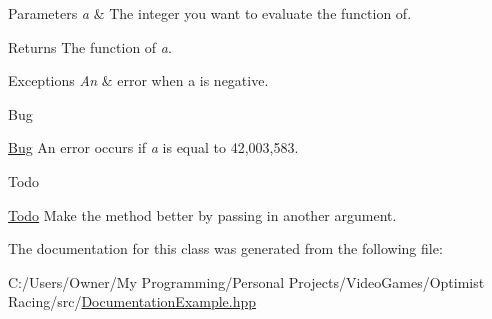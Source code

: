 \begin{DoxyParams}{Parameters}
{\em a} & The integer you want to evaluate the function of. \\
\hline
\end{DoxyParams}
\begin{DoxyReturn}{Returns}
The function of {\itshape a}. 
\end{DoxyReturn}

\begin{DoxyExceptions}{Exceptions}
{\em An} & error when a is negative. \\
\hline
\end{DoxyExceptions}
\begin{DoxyRefDesc}{Bug}
\item[\hyperlink{bug__bug000006}{Bug}]An error occurs if {\itshape a} is equal to 42,003,583. \end{DoxyRefDesc}
\begin{DoxyRefDesc}{Todo}
\item[\hyperlink{todo__todo000007}{Todo}]Make the method better by passing in another argument. \end{DoxyRefDesc}


The documentation for this class was generated from the following file\-:\begin{DoxyCompactItemize}
\item 
C\-:/\-Users/\-Owner/\-My Programming/\-Personal Projects/\-Video\-Games/\-Optimist Racing/src/\hyperlink{_documentation_example_8hpp}{Documentation\-Example.\-hpp}\end{DoxyCompactItemize}
